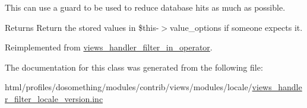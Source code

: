 This can use a guard to be used to reduce database hits as much as possible.

\begin{DoxyReturn}{Returns}
Return the stored values in \$this-\/$>$value\_\-options if someone expects it. 
\end{DoxyReturn}


Reimplemented from \hyperlink{classviews__handler__filter__in__operator_aa5b5df6d90f4359ed28c0c446bdc81a6}{views\_\-handler\_\-filter\_\-in\_\-operator}.

The documentation for this class was generated from the following file:\begin{DoxyCompactItemize}
\item 
html/profiles/dosomething/modules/contrib/views/modules/locale/\hyperlink{views__handler__filter__locale__version_8inc}{views\_\-handler\_\-filter\_\-locale\_\-version.inc}\end{DoxyCompactItemize}
